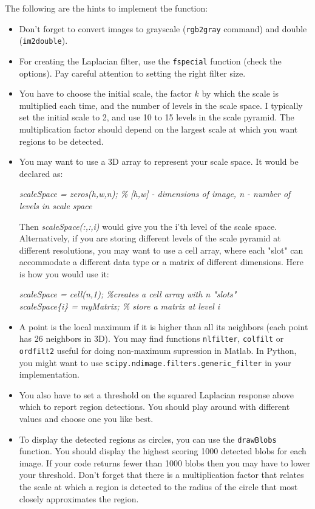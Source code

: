 \documentclass[10pt,letterpaper]{article}
\newcommand{\cmd}[1] {{\color{blue}\texttt{#1}}}
\begin{document}
The following are the hints to implement the function:

\begin{itemize}
\item Don't forget to convert images to grayscale (\cmd{rgb2gray} command) and double (\cmd{im2double}).
\item For creating the Laplacian filter, use the \cmd{fspecial} function (check the options). Pay careful attention to setting the right filter size.
\item You have to choose the initial scale, the factor $k$ by which the scale is multiplied each time, and the number of levels in the scale space. I typically set the initial scale to 2, and use 10 to 15 levels in the scale pyramid. The multiplication factor should depend on the largest scale at which you want regions to be detected.
\item You may want to use a 3D array to represent your scale space. It would be declared as:

\begin{center}
\textit{scaleSpace = zeros(h,w,n); \% [h,w] - dimensions of image, n - number of levels in scale space}
\end{center}

Then \textit{scaleSpace(:,:,i)} would give you the i'th level of the scale space. Alternatively, if you are storing different levels of the scale pyramid at different resolutions, you may want to use a cell array, where each "slot" can accommodate a different data type or a matrix of different dimensions. Here is how you would use it:
\begin{center}
\textit{scaleSpace = cell(n,1); \%creates a cell array with n "slots"} \\
\textit{scaleSpace\{i\} = myMatrix; \% store a matrix at level i}
\end{center}

\item A point is the local maximum if it is higher than all its neighbors (each point has 26 neighbors in 3D). You may find functions \cmd{nlfilter}, \cmd{colfilt} or \cmd{ordfilt2} useful for doing non-maximum supression in Matlab. In Python, you might want to use \cmd{scipy.ndimage.filters.generic\_filter} in your implementation.

\item You also have to set a threshold on the squared Laplacian response above which to report region detections. You should play around with different values and choose one you like best.

\item To display the detected regions as circles, you can use the \cmd{drawBlobs} function. You should display the highest scoring 1000 detected blobs for each image. If your code returns fewer than 1000 blobs then you may have to lower your threshold. Don't forget that there is a multiplication factor that relates the scale at which a region is detected to the radius of the circle that most closely approximates the region.
\end{itemize}
\end{document}
